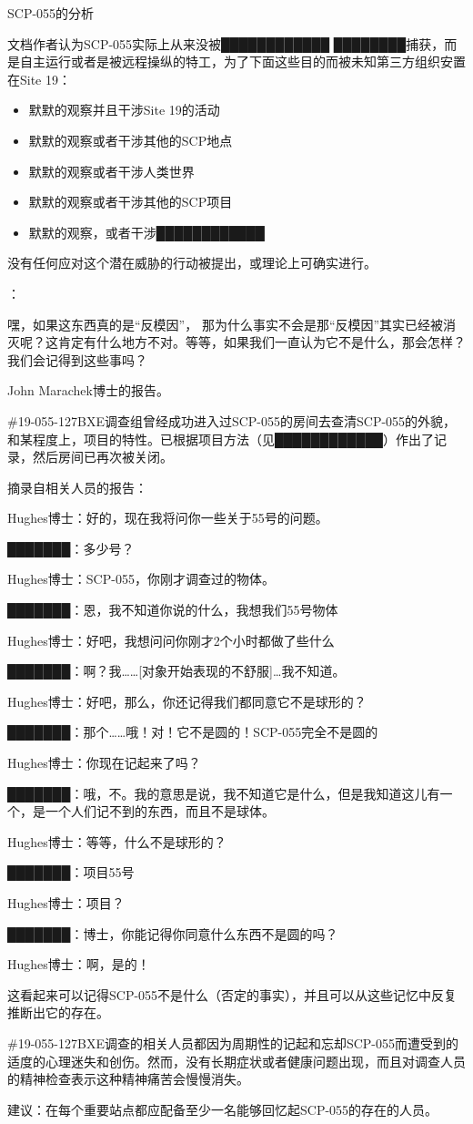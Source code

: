 SCP-055的分析

文档作者认为SCP-055实际上从来没被████████████ ████████捕获，而是自主运行或者是被远程操纵的特工，为了下面这些目的而被未知第三方组织安置在Site 19：

\begin{itemize}
\item 默默的观察并且干涉Site 19的活动
\item 默默的观察或者干涉其他的SCP地点
\item 默默的观察或者干涉人类世界
\item 默默的观察或者干涉其他的SCP项目
\item 默默的观察，或者干涉████████████
\end{itemize}

没有任何应对这个潜在威胁的行动被提出，或理论上可确实进行。

：

\begin{scpbox}

嘿，如果这东西真的是“反模因”， 那为什么事实不会是那“反模因”其实已经被消灭呢？这肯定有什么地方不对。等等，如果我们一直认为它不是什么，那会怎样？我们会记得到这些事吗？

\end{scpbox}

John Marachek博士的报告。

\#19-055-127BXE调查组曾经成功进入过SCP-055的房间去查清SCP-055的外貌，和某程度上，项目的特性。已根据项目方法（见████████████）作出了记录，然后房间已再次被关闭。

摘录自相关人员的报告：

\begin{scpbox}

Hughes博士：好的，现在我将问你一些关于55号的问题。

███████：多少号？

Hughes博士：SCP-055，你刚才调查过的物体。

███████：恩，我不知道你说的什么，我想我们55号物体

Hughes博士：好吧，我想问问你刚才2个小时都做了些什么

███████：啊？我……{[}对象开始表现的不舒服]…我不知道。

Hughes博士：好吧，那么，你还记得我们都同意它不是球形的？

███████：那个……哦！对！它不是圆的！SCP-055完全不是圆的

Hughes博士：你现在记起来了吗？

███████：哦，不。我的意思是说，我不知道它是什么，但是我知道这儿有一个，是一个人们记不到的东西，而且不是球体。

Hughes博士：等等，什么不是球形的？

███████：项目55号

Hughes博士：项目？

███████：博士，你能记得你同意什么东西不是圆的吗？

Hughes博士：啊，是的！

\end{scpbox}

这看起来可以记得SCP-055不是什么（否定的事实），并且可以从这些记忆中反复推断出它的存在。

\#19-055-127BXE调查的相关人员都因为周期性的记起和忘却SCP-055而遭受到的适度的心理迷失和创伤。然而，没有长期症状或者健康问题出现，而且对调查人员的精神检查表示这种精神痛苦会慢慢消失。

建议：在每个重要站点都应配备至少一名能够回忆起SCP-055的存在的人员。
